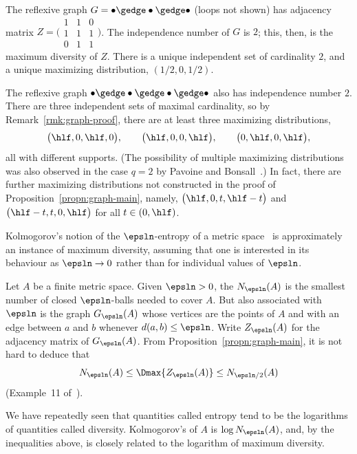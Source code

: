 \begin{example}
The reflexive graph $G =
\mbox{\ensuremath{\bullet\gedge\bullet\gedge\bullet}}$ (loops not shown) has
adjacency matrix $Z = \biggl( \begin{smallmatrix} 1 &1 &0 \\ 1& 1& 1 \\ 0&
  1& 1 \end{smallmatrix} \biggr)$.  The independence number of $G$ is $2$;
this, then, is the maximum diversity of $Z$.  There is a unique
independent set of cardinality $2$, and a unique maximizing distribution,
$(1/2, 0, 1/2)$.
\end{example}

\begin{example}
The reflexive graph
$\mbox{\ensuremath{\bullet\gedge\bullet\gedge\bullet\gedge\bullet}}$ also has
independence number $2$.  There are three independent sets of maximal
cardinality, so by Remark~\ref{rmk:graph-proof}, there are at least three
maximizing distributions,
\[
\bigl(\hlf, 0, \hlf, 0\bigr),
\qquad
\bigl(\hlf, 0, 0, \hlf\bigr),
\qquad
\bigl(0, \hlf, 0, \hlf\bigr),
\]
all with different supports.  (The possibility of multiple maximizing
distributions was also observed in the case $q = 2$ by Pavoine and
Bonsall~\cite{PaBo}.)
% 
In fact, there are further maximizing distributions not constructed in the
proof of Proposition~\ref{propn:graph-main}, namely, $\bigl(\hlf, 0, t,
\hlf - t\bigr)$ and $\bigl(\hlf - t, t, 0, \hlf\bigr)$ for all $t \in (0,
\hlf)$.
\end{example}

\begin{example}
Kolmogorov's notion of the $\epsln$-entropy of a metric
space~\cite{KolmCAC} is approximately an instance of maximum diversity,
assuming that one is interested in its behaviour as $\epsln \to 0$ rather
than for individual values of $\epsln$.

Let $A$ be a finite metric space.  Given $\epsln > 0$, the
 $N_\epsln(A)$ is the smallest number of closed $\epsln$-balls
needed to cover $A$.  But also associated with $\epsln$ is the graph%
%
% 
$G_\epsln(A)$ whose vertices are the points of $A$ and with an edge between
$a$ and $b$ whenever $d(a, b) \leq \epsln$.  Write $Z_\epsln(A)$ for the
adjacency matrix of $G_\epsln(A)$.  From
Proposition~\ref{propn:graph-main}, it is not hard to deduce that
\[
N_\epsln(A) \leq \Dmax{Z_\epsln(A)} \leq N_{\epsln/2}(A)
\]
(Example~11 of~\cite{MDBB}).  

We have repeatedly seen that quantities called entropy tend to be the
logarithms of quantities called diversity.  Kolmogorov's
%
% 
%
%
% 
of $A$ is $\log N_\epsln(A)$, and, by the inequalities above, is closely
related to the logarithm of maximum diversity.
\end{example}

